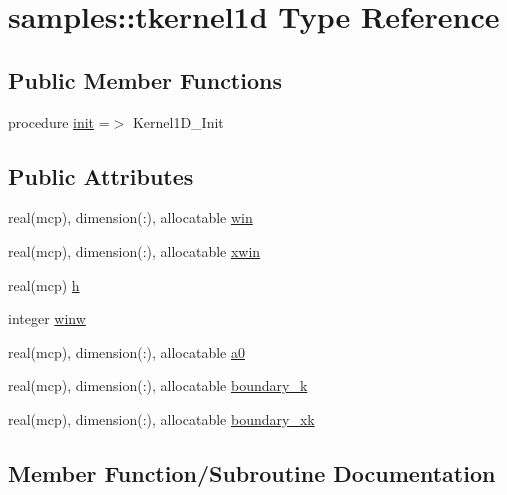 \hypertarget{structsamples_1_1tkernel1d}{}\section{samples\+:\+:tkernel1d Type Reference}
\label{structsamples_1_1tkernel1d}
\subsection*{Public Member Functions}
\begin{DoxyCompactItemize}
\item 
procedure \mbox{\hyperlink{structsamples_1_1tkernel1d_abdec5472395ab99a0a86263f29684dbf}{init}} =$>$ Kernel1\+D\+\_\+\+Init
\end{DoxyCompactItemize}
\subsection*{Public Attributes}
\begin{DoxyCompactItemize}
\item 
real(mcp), dimension(\+:), allocatable \mbox{\hyperlink{structsamples_1_1tkernel1d_a485144685b0c5beb822a70274f459c23}{win}}
\item 
real(mcp), dimension(\+:), allocatable \mbox{\hyperlink{structsamples_1_1tkernel1d_af3d5e04504dc1f17f0efd45dca9ba631}{xwin}}
\item 
real(mcp) \mbox{\hyperlink{structsamples_1_1tkernel1d_acd643b8bfceed479b68e8943d5cf8440}{h}}
\item 
integer \mbox{\hyperlink{structsamples_1_1tkernel1d_a97f46a27282b7443e1836de699ab46c0}{winw}}
\item 
real(mcp), dimension(\+:), allocatable \mbox{\hyperlink{structsamples_1_1tkernel1d_a88256478e3a753afa536a641feba6844}{a0}}
\item 
real(mcp), dimension(\+:), allocatable \mbox{\hyperlink{structsamples_1_1tkernel1d_a2d82aad3b939c1e38e72b11441b7e822}{boundary\+\_\+k}}
\item 
real(mcp), dimension(\+:), allocatable \mbox{\hyperlink{structsamples_1_1tkernel1d_a12a759dd742df32a0e0461a311dffb2c}{boundary\+\_\+xk}}
\end{DoxyCompactItemize}


\subsection{Member Function/\+Subroutine Documentation}
\mbox{\label{structsamples_1_1tkernel1d_abdec5472395ab99a0a86263f29684dbf}} 
